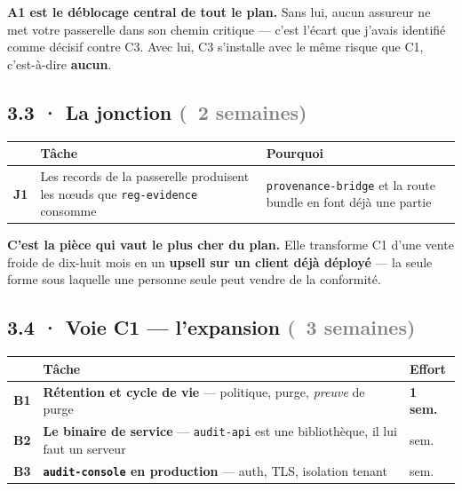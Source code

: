 \documentclass[10pt]{article}
\newcommand{\sz}[1]{\textcolor{grey}{\small\textsf{#1}}}
\newcommand{\code}[1]{\texttt{\small #1}}
\begin{document}
\begin{acquis}
\textbf{A1 est le déblocage central de tout le plan.} Sans lui, aucun assureur ne met votre passerelle
dans son chemin critique --- c'est l'écart que j'avais identifié comme décisif contre C3. Avec lui,
C3 s'installe avec le même risque que C1, c'est-à-dire \textbf{aucun}.
\end{acquis}

\subsection{3.3 · La jonction \sz{(~2 semaines)}}

\begin{center}\small
\begin{tabular}{@{}c >{\raggedright\arraybackslash}p{6.0cm} >{\raggedright\arraybackslash}p{8.0cm}@{}}
\toprule
& \textbf{Tâche} & \textbf{Pourquoi} \\
\midrule
\textbf{J1} & Les records de la passerelle produisent les nœuds que \code{reg-evidence} consomme & \code{provenance-bridge} et la route bundle en font déjà une partie \\
\bottomrule
\end{tabular}
\end{center}

\textbf{C'est la pièce qui vaut le plus cher du plan.} Elle transforme C1 d'une vente froide de
dix-huit mois en un \textbf{upsell sur un client déjà déployé} --- la seule forme sous laquelle une
personne seule peut vendre de la conformité.

\subsection{3.4 · Voie C1 --- l'expansion \sz{(~3 semaines)}}

\begin{center}\small
\begin{tabular}{@{}c >{\raggedright\arraybackslash}p{9.6cm} >{\centering\arraybackslash}p{2.2cm}@{}}
\toprule
& \textbf{Tâche} & \textbf{Effort} \\
\midrule
\textbf{B1} & \textbf{Rétention et cycle de vie} --- politique, purge, \emph{preuve} de purge & \textbf{1 sem.} \\
\textbf{B2} & \textbf{Le binaire de service} --- \code{audit-api} est une bibliothèque, il lui faut un serveur & 1 sem. \\
\textbf{B3} & \textbf{\code{audit-console} en production} --- auth, TLS, isolation tenant & 1 sem. \\
\bottomrule
\end{tabular}
\end{center}
\end{document}
